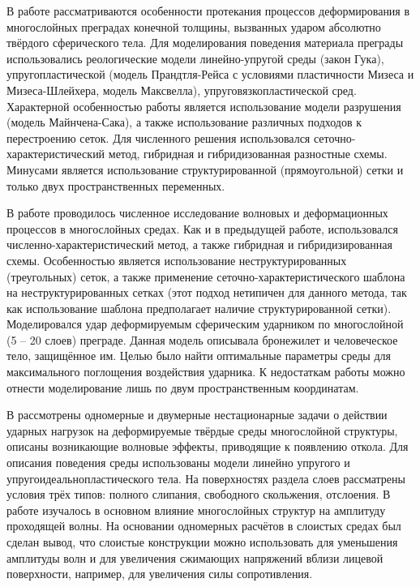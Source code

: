 В работе \cite{petrov_chelnokov} рассматриваются особенности протекания процессов деформирования в многослойных преградах конечной толщины, вызванных ударом абсолютно твёрдого сферического тела. Для моделирования поведения материала преграды использовались реологические модели линейно-упругой среды (закон Гука), упругопластической (модель Прандтля-Рейса с условиями пластичности Мизеса и Мизеса-Шлейхера, модель Максвелла), упруговязкопластической сред. Характерной особенностью работы является использование модели разрушения (модель Майнчена-Сака), а также использование различных подходов к перестроению сеток. Для численного решения использовался сеточно-характеристический метод, гибридная и гибридизованная разностные схемы. Минусами является использование структурированной (прямоугольной) сетки и только двух пространственных переменных.

В работе \cite{matyushev_petrov} проводилось численное исследование волновых и деформационных процессов в многослойных  средах. Как и в предыдущей работе, использовался численно-характеристический метод, а также гибридная и гибридизированная схемы. Особенностью является использование неструктурированных (треугольных) сеток, а также применение сеточно-характеристического шаблона на неструктурированных сетках (этот подход нетипичен для данного метода, так как использование шаблона предполагает наличие структурированной сетки). Моделировался удар деформируемым сферическим ударником по многослойной (5 – 20 слоев) преграде. Данная модель описывала бронежилет и человеческое тело, защищённое им. Целью было найти оптимальные параметры среды для максимального поглощения воздействия ударника. К недостаткам работы можно отнести моделирование лишь по двум пространственным координатам.

В \cite{petrov_tormasov_holodov} рассмотрены одномерные и двумерные нестационарные задачи о действии ударных нагрузок на деформируемые твёрдые среды многослойной структуры, описаны возникающие волновые эффекты, приводящие к появлению откола. Для описания поведения среды использованы модели линейно упругого и упругоидеальнопластического тела. На поверхностях раздела слоев рассматрены условия трёх типов: полного слипания, свободного скольжения, отслоения. В работе изучалось в основном влияние многослойных структур на амплитуду проходящей волны. На основании одномерных расчётов в слоистых средах был сделан вывод, что слоистые конструкции можно использовать для уменьшения амплитуды волн и для увеличения сжимающих напряжений вблизи лицевой поверхности, например, для увеличения силы сопротивления.

